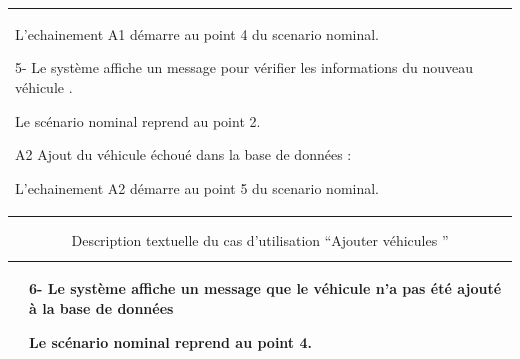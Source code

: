 \begin{table}[H]
\begin{tabular}{|p{4cm}|p{9cm}|}
    L'echainement A1 démarre au point 4 du scenario nominal.\newline

    5- Le système affiche un message pour vérifier les informations du nouveau véhicule .\newline

    Le scénario nominal reprend au point 2. \newline

    A2 Ajout du véhicule échoué dans la base de données :\newline

    L'echainement A2 démarre au point 5 du scenario nominal.                                                                      \\
  \end{tabular}

\end{table}



\begin{table}[H]
  \centering
  \renewcommand{\arraystretch}{1.1} %
  \begin{tabular}{|p{4cm}|p{9cm}|}


     & 6- Le système affiche un message que le véhicule n'a pas été ajouté à la base de données\newline

    Le scénario nominal reprend au point 4.                                                             \\

    \hline
  \end{tabular}
  \caption{Description textuelle du cas d’utilisation “Ajouter véhicules ”}

\end{table}

